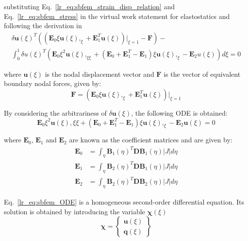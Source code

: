 substituting Eq.~\ref{lr_eq:sbfem_strain_disp_relation} and Eq.~\ref{lr_eq:sbfem_stress} in the virtual work statement for elastostatics and following the derivation in \cite{Deeks2002}
\begin{equation}
    \begin{aligned}
        \delta \mathbf{u}(\xi)^{T} \left(
            (\mathbf{E}_0 \xi \mathbf{u}(\xi),_{\xi}
            + \mathbf{E}_1^T \mathbf{u}(\xi))|_{\xi=1}
            - \mathbf{F}
        \right) - \\
        \int_0^1 \delta u(\xi)^T\left(
            \mathbf{E}_0 \xi^2 \mathbf{u}(\xi),_{\xi\xi} + (\mathbf{E}_0 + \mathbf{E}_1^T - \mathbf{E}_1) \xi \mathbf{u}(\xi),_{\xi}
            - \mathbf{E}_2 u(\xi)
        \right) d\xi = 0
    \end{aligned}
    \label{lr_eq:sbfem_virtual_work}
\end{equation}

where $\mathbf{u}(\xi)$ is the nodal displacement vector and $\mathbf{F}$ is the vector of equivalent boundary nodal forces, given by:
\begin{equation}
    \mathbf{F} = (\mathbf{E}_0 \xi \mathbf{u}(\xi),_{\xi} + \mathbf{E}_1^T \mathbf{u}(\xi))|_{\xi=1}
    \label{lr_eq:sbfem_nodal forces}
\end{equation}

By considering the arbitrariness of $\delta \mathbf{u}(\xi)$, the following ODE is obtained:
\begin{equation}
    \mathbf{E}_0 \xi^2 \mathbf{u}(\xi),{\xi\xi} + (\mathbf{E}_0 + \mathbf{E}_1^T - \mathbf{E}_1)\xi \mathbf{u}(\xi),_{\xi} - \mathbf{E}_2 \mathbf{u}(\xi) = 0
    \label{lr_eq:sbfem_ODE}
\end{equation}

where $\mathbf{E}_0$, $\mathbf{E}_1$ and $\mathbf{E}_2$ are known as the coefficient matrices and are given by:
\begin{equation}
    \begin{aligned}
        \mathbf{E}_0 &= \int_\eta \mathbf{B}_1(\eta)^T \mathbf{DB}_1(\eta)|J|d\eta \\
        \mathbf{E}_1 &= \int_\eta \mathbf{B}_2(\eta)^T \mathbf{DB}_1(\eta)|J|d\eta \\
        \mathbf{E}_2 &= \int_\eta \mathbf{B}_2(\eta)^T \mathbf{DB}_2(\eta)|J|d\eta
    \end{aligned}
    \label{lr_eq:sbfem_coe_matrix}
\end{equation}

Eq.~\ref{lr_eq:sbfem_ODE} is a homogeneous second-order differential equation.
Its solution is obtained by introducing the variable $\mathbf{\chi}(\xi)$
\begin{equation}
    \mathbf{\chi} = \left\{
        \begin{matrix}
            \mathbf{u}(\xi)  \\
            \mathbf{q}(\xi)
        \end{matrix}
    \right\}
    \label{lr_eq:sbfem_ODE_soltion}
\end{equation}

